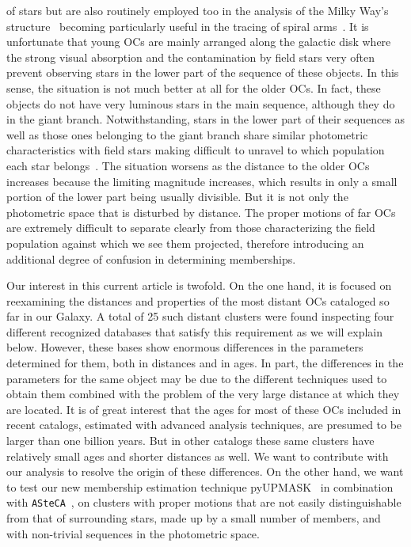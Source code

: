 \documentclass{aa}
\begin{document}
 of stars \citep{Lada2003} but are also routinely employed too in the analysis
 of the Milky Way's
 structure~\citep{Loktin_1992,Moitinho_2006,Vazquez2008,Moitinho_2010}
 becoming particularly useful in the tracing of spiral
 arms~\citep{carraro_2013,Molina_2018}.
 It is unfortunate that young OCs are mainly arranged along the galactic disk
 where the strong visual absorption and the contamination by field stars very
 often prevent observing stars in the lower part of the sequence of these
 objects. In this sense, the situation is not much better at all for the older
 OCs. In fact, these objects do not have very luminous stars in the main
 sequence, although they do in the giant branch. Notwithstanding, stars in the
 lower part of their sequences as well as those ones belonging to the giant
 branch share similar photometric characteristics with field stars making
 difficult to unravel to which population each star belongs~\citep{Hayes2015}.
 The situation worsens as the distance to the older OCs increases because the
 limiting magnitude increases, which results in only a small portion of
 the lower part being usually divisible. But it is not only the photometric
 space that is disturbed by distance. The proper motions of far OCs are
 extremely difficult to separate clearly from those characterizing the field
 population against which we see them projected, therefore introducing an
 additional degree of confusion in determining memberships.

 Our interest in this current article is twofold. On the one hand, it is focused
 on reexamining the distances and properties of the most distant OCs cataloged
 so far in our Galaxy. A total of 25 such distant clusters were found
 inspecting four different recognized databases that satisfy this requirement as
 we will explain below. However, these bases show enormous differences in the
 parameters determined for them, both in distances and in ages. In part, the
 differences in the parameters for the same object may be
 due to the different techniques used to obtain them combined with the problem
 of the very large distance at which they are located.
 It is of great interest that the ages for most of these OCs included in recent
 catalogs, estimated with advanced analysis techniques, are presumed to be
 larger than one billion years. But in other catalogs these same clusters have
 relatively small ages and shorter distances as well. We want to
 contribute with our analysis to resolve the origin of these differences.
 On the other hand, we want to test our new membership estimation technique
 pyUPMASK~\citep{Pera_2021} in combination with
 \texttt{ASteCA}~\citep{Perren_2015}, on clusters with proper motions that are
 not easily distinguishable from that of surrounding stars, made up by a small
 number of members, and with non-trivial sequences in the photometric space.\\
\end{document}
